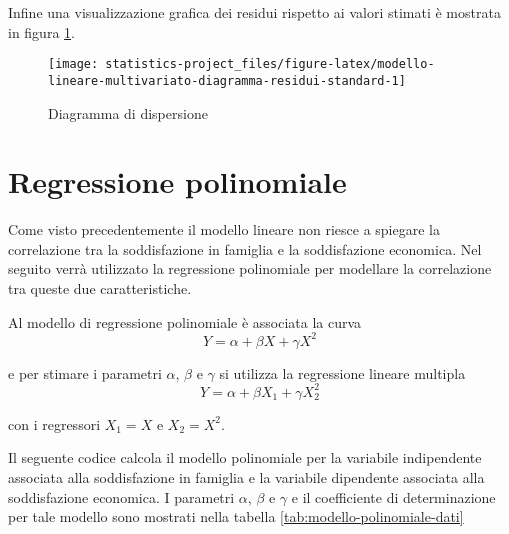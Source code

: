 \documentclass[]{book}
\newenvironment{Shaded}{\begin{snugshade}}{\end{snugshade}}
\newcommand{\KeywordTok}[1]{\textcolor[rgb]{0.13,0.29,0.53}{\textbf{#1}}}
\newcommand{\DecValTok}[1]{\textcolor[rgb]{0.00,0.00,0.81}{#1}}
\newcommand{\StringTok}[1]{\textcolor[rgb]{0.31,0.60,0.02}{#1}}
\newcommand{\OperatorTok}[1]{\textcolor[rgb]{0.81,0.36,0.00}{\textbf{#1}}}
\newcommand{\NormalTok}[1]{#1}
\begin{document}
Infine una visualizzazione grafica dei residui rispetto ai valori
stimati è mostrata in figura
\ref{fig:modello-lineare-multivariato-diagramma-residui-standard}.

\begin{figure}

{\centering \texttt{[image: statistics-project\_files/figure-latex/modello-lineare-multivariato-diagramma-residui-standard-1]} 

}

\caption{Diagramma di dispersione}\label{fig:modello-lineare-multivariato-diagramma-residui-standard}
\end{figure}

\section{Regressione polinomiale}\label{regressione-polinomiale}

Come visto precedentemente il modello lineare non riesce a spiegare la
correlazione tra la soddisfazione in famiglia e la soddisfazione
economica. Nel seguito verrà utilizzato la regressione polinomiale per
modellare la correlazione tra queste due caratteristiche.

Al modello di regressione polinomiale è associata la curva
\[Y = \alpha + \beta X + \gamma X^2\]

e per stimare i parametri \(\alpha\), \(\beta\) e \(\gamma\) si utilizza
la regressione lineare multipla
\[Y = \alpha + \beta X_1 + \gamma X_2^2\]

con i regressori \(X_1=X\) e \(X_2=X^2\).

Il seguente codice calcola il modello polinomiale per la variabile
indipendente associata alla soddisfazione in famiglia e la variabile
dipendente associata alla soddisfazione economica. I parametri
\(\alpha\), \(\beta\) e \(\gamma\) e il coefficiente di determinazione
per tale modello sono mostrati nella tabella
\ref{tab:modello-polinomiale-dati}

\begin{Shaded}
\end{Shaded}
\end{document}
